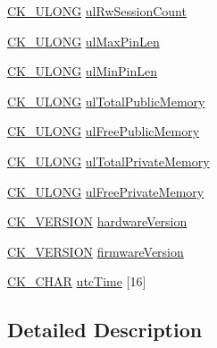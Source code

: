 \begin{DoxyCompactItemize}
\item 
\hyperlink{pkcs11t_8h_a35181858a3b7a0a81f49d180d8f446ef}{C\+K\+\_\+\+U\+L\+O\+NG} \hyperlink{struct_c_k___t_o_k_e_n___i_n_f_o_a752bc366b6d7bf2b56b1e4bd22d4b647}{ul\+Rw\+Session\+Count}
\item 
\hyperlink{pkcs11t_8h_a35181858a3b7a0a81f49d180d8f446ef}{C\+K\+\_\+\+U\+L\+O\+NG} \hyperlink{struct_c_k___t_o_k_e_n___i_n_f_o_a1f29203a601da021aec840cf41f6e88f}{ul\+Max\+Pin\+Len}
\item 
\hyperlink{pkcs11t_8h_a35181858a3b7a0a81f49d180d8f446ef}{C\+K\+\_\+\+U\+L\+O\+NG} \hyperlink{struct_c_k___t_o_k_e_n___i_n_f_o_a257a8ad60444cccd096244845bf5cd5c}{ul\+Min\+Pin\+Len}
\item 
\hyperlink{pkcs11t_8h_a35181858a3b7a0a81f49d180d8f446ef}{C\+K\+\_\+\+U\+L\+O\+NG} \hyperlink{struct_c_k___t_o_k_e_n___i_n_f_o_a0aa3a573f644deb017cf90248815d9a1}{ul\+Total\+Public\+Memory}
\item 
\hyperlink{pkcs11t_8h_a35181858a3b7a0a81f49d180d8f446ef}{C\+K\+\_\+\+U\+L\+O\+NG} \hyperlink{struct_c_k___t_o_k_e_n___i_n_f_o_afa0e875af02a7e9402ac3d78d517a7f5}{ul\+Free\+Public\+Memory}
\item 
\hyperlink{pkcs11t_8h_a35181858a3b7a0a81f49d180d8f446ef}{C\+K\+\_\+\+U\+L\+O\+NG} \hyperlink{struct_c_k___t_o_k_e_n___i_n_f_o_a042bdb8180b0229b4b93a0198c96da6e}{ul\+Total\+Private\+Memory}
\item 
\hyperlink{pkcs11t_8h_a35181858a3b7a0a81f49d180d8f446ef}{C\+K\+\_\+\+U\+L\+O\+NG} \hyperlink{struct_c_k___t_o_k_e_n___i_n_f_o_adad9cc7cf84f4499afbf4c9ca2782753}{ul\+Free\+Private\+Memory}
\item 
\hyperlink{struct_c_k___v_e_r_s_i_o_n}{C\+K\+\_\+\+V\+E\+R\+S\+I\+ON} \hyperlink{struct_c_k___t_o_k_e_n___i_n_f_o_ac392afd0c02f4d48bd163abe68618f12}{hardware\+Version}
\item 
\hyperlink{struct_c_k___v_e_r_s_i_o_n}{C\+K\+\_\+\+V\+E\+R\+S\+I\+ON} \hyperlink{struct_c_k___t_o_k_e_n___i_n_f_o_a2851fdb1978d35536ef5b4992a93e3e1}{firmware\+Version}
\item 
\hyperlink{pkcs11t_8h_a0ed4ef152a55e26f435b876927145580}{C\+K\+\_\+\+C\+H\+AR} \hyperlink{struct_c_k___t_o_k_e_n___i_n_f_o_a381d3a6da89db61815436a01596cf618}{utc\+Time} \mbox{[}16\mbox{]}
\end{DoxyCompactItemize}


\subsection{Detailed Description}


